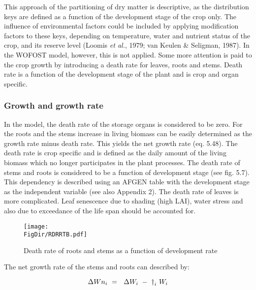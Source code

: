 This approach of the partitioning of dry mat\-ter is descriptive, as the distribution keys are
defined as a function of the development stage of the crop only. The influence of
environmental factors could be included by applying modification factors to these keys,
depending on temperature, water and nutrient status of the crop, and its reserve level
(Loomis {\it et al.}, 1979; van Keulen \& Seligman, 1987). In the WOFOST model, however,
this is not applied. Some more attention is paid to the crop growth by introducing a death
rate for leaves, roots and stems. Death rate is a function of the development stage of the
plant and is crop and organ specific.

\subsubsection{Growth and growth rate}
In the model, the death rate of the storage organs is considered to be zero. For the roots
and the stems increase in living biomass can be easily determined as the growth rate
minus death rate. This yields the net growth rate (eq. 5.48). The death rate is crop
specific and is defined as the daily amount of the living biomass which no longer
participates in the plant processes. The death rate of stems and roots is considered to be a
function of development stage (see fig. 5.7). This dependency is described using an
AFGEN table with the development stage as the independent variable (see also Appendix
2). The death rate of leaves is more complicat\-ed. Leaf senescence due to shading (high
LAI), water stress and also due to exceedance of the life span should be accounted for.


\begin{figure}[p]
\centering
\texttt{[image: \\FigDir/RDRRTB.pdf]}
\caption{Death rate of roots and stems as a function of development rate}
\label{fig:DeathRoots}
\end{figure}


The net growth rate of the stems and roots can described by:

\begin{equation}
\Delta Wn _{i~} =~\,\,\Delta W _{i~} -~ {\rm \dag } _{i} \,\, W _{i} 
\end{equation}

